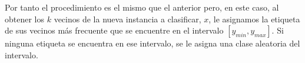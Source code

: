 Por tanto el procedimiento es el mismo que el anterior pero, en este caso, al obtener los $k$ vecinos de la nueva instancia a clasificar, $x$, le asignamos la etiqueta de sus vecinos más frecuente que se encuentre en el intervalo $\left[y_{min},y_{max}\right]$. Si ninguna etiqueta se encuentra en ese intervalo, se le asigna una clase aleatoria del intervalo.
